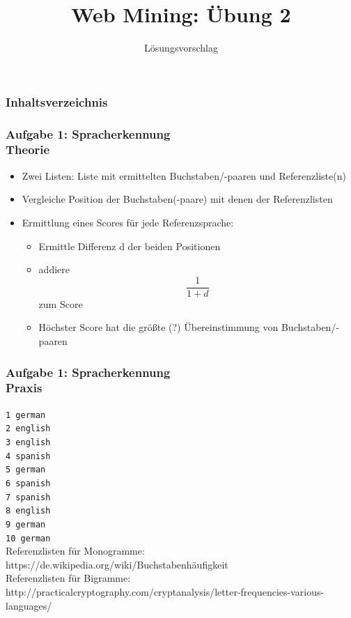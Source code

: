 \documentclass[accentcolor=tud7b,noresetcounter]{tudbeamer}
\title%
{Web Mining: Übung 2}
\subtitle{Lösungsvorschlag}
\author[Ingo Adrian und Steffen Pegenau]{}
\institute[Fachbereich Informatik]{}
\date[\today]
\begin{document}
  \begin{titleframe}
  \end{titleframe}
  
  \begin{frame}
	\frametitle{Inhaltsverzeichnis}
	\tableofcontents
  \end{frame}
  
  \begin{frame}
	\frametitle{Aufgabe 1: Spracherkennung\\
	Theorie}
	\begin{itemize}
		\item Zwei Listen: Liste mit ermittelten Buchstaben/-paaren und Referenzliste(n)
		\item Vergleiche Position der Buchstaben(-paare) mit denen der Referenzlisten
		\item Ermittlung eines Scores für jede Referenzsprache:
			\begin{itemize}
				\item Ermittle Differenz d der beiden Positionen
				\item addiere $$\frac{1}{1 + d}$$ zum Score
				\item Höchster Score hat die größte (?) Übereinstimmung von Buchstaben/-paaren
			\end{itemize}
	\end{itemize}
  \end{frame}  
  
  \begin{frame}
	\frametitle{Aufgabe 1: Spracherkennung\\
	Praxis}
	\texttt{1 german\\
	2 english\\
	3 english\\
	4 spanish\\
	5 german\\
	6 spanish\\
	7 spanish\\
	8 english\\
	9 german\\
	10 german\\}
	\vspace{\fill}
	Referenzlisten für Monogramme: {\small https://de.wikipedia.org/wiki/Buchstabenhäufigkeit}\\
	Referenzlisten für Bigramme: {\small http://practicalcryptography.com/cryptanalysis/letter-frequencies-various-languages/}
	
  \end{frame}
  
\end{document}
